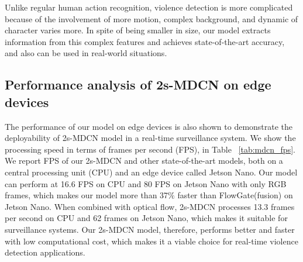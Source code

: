       Unlike regular human action recognition, violence detection is more complicated because of the involvement of more motion, complex background, and dynamic of character varies more.
      In spite of being smaller in size, our model extracts information from this complex features and achieves state-of-the-art accuracy, and also can be used in real-world situations.
      

 

\subsection{Performance analysis of 2s-MDCN on edge devices}
    The performance of our model on edge devices is also shown to demonstrate the deployability of 2s-MDCN model in a real-time surveillance system.
    We show the processing speed in terms of frames per second (FPS), in Table ~\ref{tab:mdcn_fps}. We report FPS of our 2s-MDCN and other state-of-the-art models, both on a central processing unit (CPU) and an edge device called Jetson Nano.
    Our model can perform at 16.6 FPS on CPU and 80 FPS on Jetson Nano with only RGB frames, which makes our model more than 37$\%$ faster than FlowGate(fusion) on Jetson Nano. 
    When combined with optical flow, 2s-MDCN processes 13.3 frames per second on CPU and 62 frames on Jetson Nano, which makes it suitable for surveillance systems.
    Our 2s-MDCN model, therefore, performs better and faster with low computational cost, which makes it a viable choice for real-time violence detection applications.